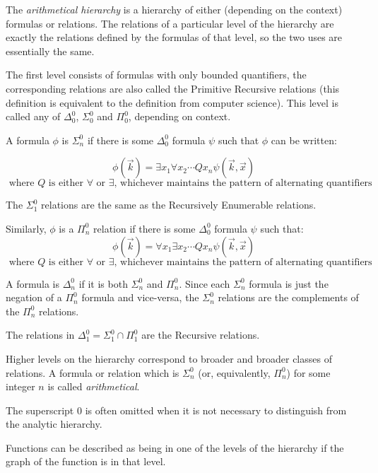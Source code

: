 \documentclass[12pt]{article}
\begin{document}
The \emph{arithmetical hierarchy} is a hierarchy of either (depending on the context) formulas or relations.  The relations of a particular level of the hierarchy are exactly the relations defined by the formulas of that level, so the two uses are essentially the same.

The first level consists of formulas with only bounded quantifiers, the corresponding relations are also called the Primitive Recursive relations (this definition is equivalent to the definition from computer science).  This level is called any of $\Delta^0_0$, $\Sigma^0_0$ and $\Pi^0_0$, depending on context.

A formula $\phi$ is $\Sigma^0_n$ if there is some $\Delta^0_0$ formula $\psi$ such that $\phi$ can be written:

$$\phi(\vec k)=\exists x_1\forall x_2\cdots {Q}x_n\psi(\vec k,\vec x)$$
$$\text{ where }Q\text{ is either }\forall\text{ or }\exists\text{, whichever maintains the pattern of alternating quantifiers}
$$

The $\Sigma^0_1$ relations are the same as the Recursively Enumerable relations.

Similarly, $\phi$ is a $\Pi^0_n$ relation if there is some $\Delta^0_0$ formula $\psi$ such that:
$$\phi(\vec k)=\forall x_1\exists x_2\cdots Q x_n\psi(\vec k,\vec x)$$
$$\text{ where }Q\text{ is either }\forall\text{ or }\exists\text{, whichever maintains the pattern of alternating quantifiers}
$$

A formula is $\Delta^0_n$ if it is both $\Sigma^0_n$ and $\Pi^0_n$.  Since each $\Sigma^0_n$ formula is just the negation of a $\Pi^0_n$ formula and vice-versa, the $\Sigma^0_n$ relations are the complements of the $\Pi^0_n$ relations.

The relations in $\Delta^0_1 = \Sigma^0_1 \cap \Pi^0_1$ are the Recursive relations.

Higher levels on the hierarchy correspond to broader and broader classes of relations.  A formula or relation which is $\Sigma^0_n$ (or, equivalently, $\Pi^0_n$) for some integer $n$ is called \emph{arithmetical}.

The superscript $0$ is often omitted when it is not necessary to distinguish from the analytic hierarchy.

Functions can be described as being in one of the levels of the hierarchy if the graph of the function is in that level.
\end{document}
